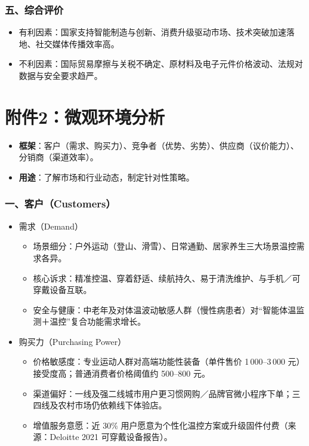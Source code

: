\documentclass[UTF8]{report}
\theoremstyle{MyLineTheoremStyle} %
\theoremstyle{MyBlockTheoremStyle} %
\theoremstyle{MySubsubsectionStyle} %
\begin{document}
    \subsubsection{五、综合评价}
        \begin{itemize}
            \item 有利因素：国家支持智能制造与创新、消费升级驱动市场、技术突破加速落地、社交媒体传播效率高。
            \item 不利因素：国际贸易摩擦与关税不确定、原材料及电子元件价格波动、法规对数据与安全要求趋严。
        \end{itemize}


\section{附件2：微观环境分析}
\begin{itemize}
    \item \textbf{框架}：客户（需求、购买力）、竞争者（优势、劣势）、供应商（议价能力）、分销商（渠道效率）。
    \item \textbf{用途}：了解市场和行业动态，制定针对性策略。
\end{itemize}

\subsubsection{一、客户（Customers）}
    \begin{itemize}
      \item 需求（Demand）
        \begin{itemize}
          \item 场景细分：户外运动（登山、滑雪）、日常通勤、居家养生三大场景温控需求各异。
          \item 核心诉求：精准控温、穿着舒适、续航持久、易于清洗维护、与手机／可穿戴设备互联。
          \item 安全与健康：中老年及对体温波动敏感人群（慢性病患者）对“智能体温监测＋温控”复合功能需求增长。
        \end{itemize}
      \item 购买力（Purchasing Power）
        \begin{itemize}
          \item 价格敏感度：专业运动人群对高端功能性装备（单件售价 1\,000–3\,000 元）接受度高；普通消费者价格阈值约 500–800 元。
          \item 渠道偏好：一线及强二线城市用户更习惯网购／品牌官微小程序下单；三四线及农村市场仍依赖线下体验店。
          \item 增值服务意愿：近 30\% 用户愿意为个性化温控方案或升级固件付费（来源：Deloitte 2021 可穿戴设备报告）。
        \end{itemize}
    \end{itemize}
\end{document}
